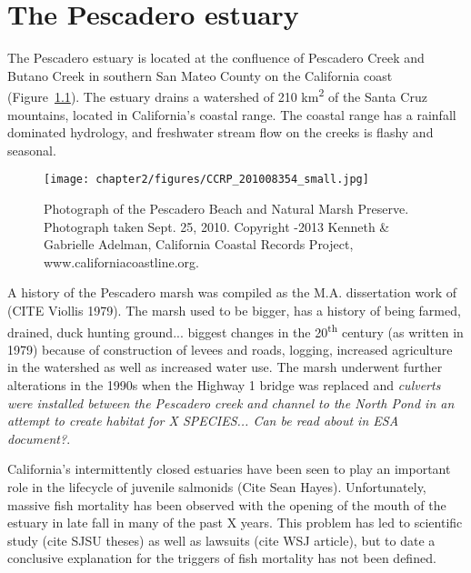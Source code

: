 \chapter{The Pescadero estuary} \label{chPescadero}

The Pescadero estuary is located at the confluence of Pescadero Creek and Butano Creek in southern San Mateo County on the California coast (Figure~\ref{fig:ccrp_2010}). The estuary drains a watershed of 210 km\textsuperscript{2} of the Santa Cruz mountains, located in California's coastal range. The coastal range has a rainfall dominated hydrology, and freshwater stream flow on the creeks is flashy and seasonal.


% 
\begin{figure}
\texttt{[image: chapter2/figures/CCRP\_201008354\_small.jpg]} \caption{Photograph of the Pescadero Beach and Natural Marsh Preserve. Photograph taken Sept. 25,
2010. Copyright -2013 Kenneth \& Gabrielle
Adelman, California Coastal Records Project,
www.californiacoastline.org.} \label{fig:ccrp_2010} \end{figure}


A history of the Pescadero marsh was compiled as
the M.A. dissertation work of (CITE Viollis 1979). The marsh used to be bigger, has a history of being farmed, drained, duck hunting ground... biggest changes in the 20\textsuperscript{th} century (as written in
1979) because of construction of levees and roads, logging, increased
agriculture in the watershed as well as increased water use. The marsh underwent further alterations in the 1990s when the Highway 1 bridge was replaced and \emph{culverts were installed between the Pescadero creek and channel to the North Pond in an attempt to create habitat for X SPECIES... Can be read about in ESA document?}.

California's intermittently closed estuaries have been seen to play an important role in the lifecycle of juvenile salmonids (Cite Sean Hayes). Unfortunately, massive fish mortality has been observed with the opening of the mouth of the estuary in late fall in many of the past X years. This problem has led to scientific study (cite SJSU theses) as well as lawsuits (cite WSJ article), but to date a conclusive explanation for the triggers of fish mortality has not been defined. 

